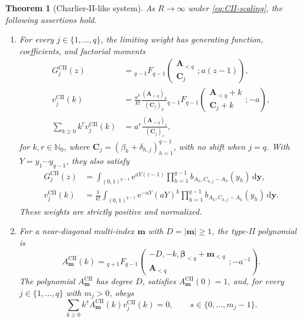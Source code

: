 \documentclass[10pt,a4paper]{amsart}
\newtheorem{theorem}{Theorem}
\newcommand{\A}{\boldsymbol A}
\newcommand{\Nzero}{\mathbb N_0}
\newcommand{\abs}[1]{\lvert#1\rvert}
\newcommand{\bbeta}{\boldsymbol\beta}
\newcommand{\dd}{\,\mathrm d}
\newcommand{\e}{\mathrm e}
\newcommand{\fall}[2]{#1^{\underline{#2}}}
\newcommand{\mm}{\boldsymbol m}
\newcommand{\pFq}[5]{{}_{#1}F_{#2}\!\left(\begin{matrix}#3\\#4\end{matrix};#5\right)}
\begin{document}
\begin{theorem}[Charlier-II-like system]
\label{thm:CII-system}
As \(R\to\infty\) under \eqref{eq:CII-scaling}, the following assertions hold.
\begin{enumerate}[label=\textnormal{(\roman*)}]
\item For every
\(j\in\{1,\ldots,q\}\), the limiting weight has generating function,
coefficients, and factorial moments
\begin{align}
 G_j^{\mathrm{CII}}(z)
 &=\pFq{q-1}{q-1}{\A_{<q}}{\boldsymbol C_j}{a(z-1)},
 \label{eq:CII-pgf}\\
 v_j^{\mathrm{CII}}(k)
 &=\frac{a^k}{k!}
 \frac{(\A_{<q})_k}{(\boldsymbol C_j)_k}
 \pFq{q-1}{q-1}{\A_{<q}+k}{\boldsymbol C_j+k}{-a},
 \label{eq:CII-mass}\\
 \sum_{k\ge0}\fall{k}{r}v_j^{\mathrm{CII}}(k)
 &=a^r\frac{(\A_{<q})_r}{(\boldsymbol C_j)_r},
 \label{eq:CII-moments}
\end{align}
for \(k,r\in\Nzero\), where
\(\boldsymbol C_j=(\beta_h+\delta_{h,j})_{h=1}^{q-1}\), with no shift
when \(j=q\). With \(Y=y_1\cdots y_{q-1}\), they also satisfy
\begin{align}
 G_j^{\mathrm{CII}}(z)
 &=\int_{(0,1)^{q-1}}\e^{aY(z-1)}
 \prod_{h=1}^{q-1}b_{A_h,C_{h,j}-A_h}(y_h)\dd\boldsymbol y,
 \label{eq:CII-Euler-integral}\\
 v_j^{\mathrm{CII}}(k)
 &=\frac1{k!}\int_{(0,1)^{q-1}}\e^{-aY}(aY)^k
 \prod_{h=1}^{q-1}b_{A_h,C_{h,j}-A_h}(y_h)\dd\boldsymbol y.
 \label{eq:CII-positive-coefficients}
\end{align}
These weights are strictly positive and normalized.

\item For a near-diagonal multi-index \(\mm\) with \(D=\abs\mm\ge1\),
the type-II polynomial is
\begin{equation}
 A_{\mm}^{\mathrm{CII}}(k)
 =\pFq{q+1}{q-1}
 {-D,-k,\bbeta_{<q}+\mm_{<q}}{\A_{<q}}{-a^{-1}}.
 \label{eq:CII-A}
\end{equation}
The polynomial \(A_{\mm}^{\mathrm{CII}}\) has degree \(D\), satisfies
\(A_{\mm}^{\mathrm{CII}}(0)=1\), and, for every
\(j\in\{1,\ldots,q\}\) with \(m_j>0\), obeys
\begin{equation}
 \sum_{k\ge0}\fall{k}{s}A_{\mm}^{\mathrm{CII}}(k)
 v_j^{\mathrm{CII}}(k)=0,
 \qquad s\in\{0,\ldots,m_j-1\}.
 \label{eq:CII-A-orthogonality}
\end{equation}


\end{enumerate}
\end{theorem}
\end{document}
